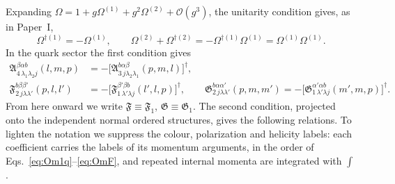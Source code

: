 \documentclass[11pt,a4paper]{article}
\numberwithin{equation}{section}
\newcommand{\mf}[1]{\mathfrak{#1}}
\newcommand{\dg}{\dagger}
\newcommand{\OM}{\Omega}
\newcommand{\order}[1]{\mathcal{O}(#1)}
\begin{document}
Expanding $\OM=1+g\OM^{(1)}+g^{2}\OM^{(2)}+\order{g^{3}}$, the unitarity condition gives, as in
Paper~I,
\begin{equation}
\OM^{\dg(1)}=-\OM^{(1)},\qquad
\OM^{(2)}+\OM^{\dg(2)}=-\OM^{\dg(1)}\OM^{(1)}=\OM^{(1)}\OM^{(1)} .
\label{eq:U12}
\end{equation}
In the quark sector the first condition gives
\begin{align}
\mf A^{\beta\alpha b}_{4\,\lambda_{1}\lambda_{2}j}(l,m,p)&=-\big[\mf A^{b\alpha\beta}_{3\,j\lambda_{2}\lambda_{1}}(p,m,l)\big]^{\dg},
\nonumber\\
\mf F^{b\beta\beta'}_{2\,j\lambda\lambda'}(p,l,l')&=-\big[\mf F^{\beta'\beta b}_{1\,\lambda'\lambda j}(l',l,p)\big]^{\dg},
\qquad
\mf G^{b\alpha\alpha'}_{2\,j\lambda\lambda'}(p,m,m')=-\big[\mf G^{\alpha'\alpha b}_{1\,\lambda'\lambda j}(m',m,p)\big]^{\dg}.
\label{eq:U1}
\end{align}
From here onward we write $\mf F\equiv\mf F_{1}$, $\mf G\equiv\mf G_{1}$. The second condition,
projected onto the independent normal ordered structures, gives the following relations. To
lighten the notation we suppress the colour, polarization and helicity labels: each coefficient
carries the labels of its momentum arguments, in the order of Eqs.~\eqref{eq:Om1q}--\eqref{eq:OmF},
and repeated internal momenta are integrated with $\int$.
\end{document}
